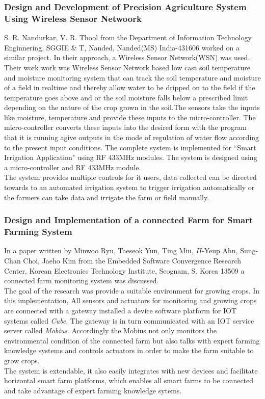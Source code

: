 \documentclass[12pt, a4paper]{article}
\begin{document}
\subsubsection{Design and Development of Precision Agriculture System Using Wireless Sensor Netwoork}
S. R. Nandurkar, V. R. Thool \cite{6808017} from the Department of Information Technology Enginnering, SGGIE \& T, Nanded, Nanded(MS) India-431606 worked on a similar project. In their approach, a Wireless Sensor Network(WSN) was used.\\
Their work work was Wireless Sensor Network based low cast soil temperature and moisture monitoring system that can track the soil temperature and moisture of a field in realtime and thereby allow water to be dripped on to the field if the temperature goes above and or the soil moisture falls below a prescribed limit depending on the nature of the crop grown in the soil.The sensors take the inputs like moisture, temperature and provide these inputs to the micro-controller. The micro-controller converts these inputs into the desired form with the program that it is running agive outputs in the mode of regulation of water flow according to the present input conditions. The complete system is implemented for ``Smart Irrigation Application" using RF 433MHz modules. The system is designed using a micro-controller and RF 433MHz module.\\ The system provides multiple controls for it users, data collected can be directed towards to an automated irrigation system to trigger irrigation automatically or the farmers can take data and irrigate the farm or field manually.  

\subsubsection{Design and Implementation of a connected Farm for Smart Farming System}
In a paper written by Minwoo Ryu, Taeseok Yun, Ting Miu, $\Pi$-Yeup Ahn, Sung-Chan Choi, Jaeho Kim \cite{7370624} from the Embedded Software Convergence Research Center, Korean Electronics Technology Institute, Seognam, S. Korea 13509 a connected farm monitoring system was discussed.\\
The goal of the research was provide a suitable environment for growing crops. In this implementation, All sensors and actuators for monitoring and growing crops are connected with a gateway installed a device software platform for IOT systems called \emph{Cube}. The gateway is in turn communicated with an IOT service server called \emph{Mobius}. Accordingly the Mobius not only monitors the environmental condition of the connected farm but also talks with expert farming knowledge systems and controls actuators in order to make the farm suitable to grow crops.\\
The system is extendable, it also easily integrates with new devices and facilitate horizontal smart farm platforms, which enables all smart farms to be connected and take advantage of expert farming knowledge sytems.    
  
\end{document}
